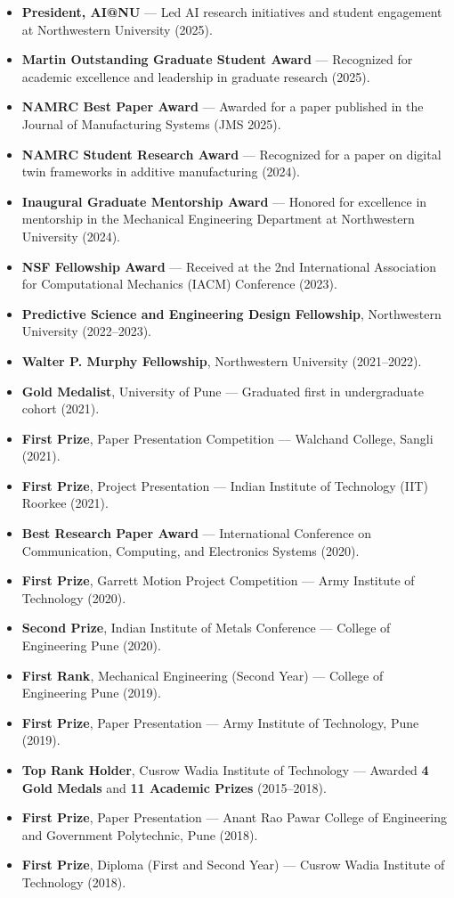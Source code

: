 \documentclass[11pt,a4paper,sans]{moderncv}
\begin{document}
\begin{itemize}
    \item \textbf{President, AI@NU} — Led AI research initiatives and student engagement at Northwestern University (2025).
    \item \textbf{Martin Outstanding Graduate Student Award} — Recognized for academic excellence and leadership in graduate research (2025).
    \item \textbf{NAMRC Best Paper Award} — Awarded for a paper published in the Journal of Manufacturing Systems (JMS 2025).
    \item \textbf{NAMRC Student Research Award} — Recognized for a paper on digital twin frameworks in additive manufacturing (2024).
    \item \textbf{Inaugural Graduate Mentorship Award} — Honored for excellence in mentorship in the Mechanical Engineering Department at Northwestern University (2024).
    \item \textbf{NSF Fellowship Award} — Received at the 2nd International Association for Computational Mechanics (IACM) Conference (2023).
    \item \textbf{Predictive Science and Engineering Design Fellowship}, Northwestern University (2022–2023).
    \item \textbf{Walter P. Murphy Fellowship}, Northwestern University (2021–2022).
    \item \textbf{Gold Medalist}, University of Pune — Graduated first in undergraduate cohort (2021).
    \item \textbf{First Prize}, Paper Presentation Competition — Walchand College, Sangli (2021).
    \item \textbf{First Prize}, Project Presentation — Indian Institute of Technology (IIT) Roorkee (2021).
    \item \textbf{Best Research Paper Award} — International Conference on Communication, Computing, and Electronics Systems (2020).
    \item \textbf{First Prize}, Garrett Motion Project Competition — Army Institute of Technology (2020).
    \item \textbf{Second Prize}, Indian Institute of Metals Conference — College of Engineering Pune (2020).
    \item \textbf{First Rank}, Mechanical Engineering (Second Year) — College of Engineering Pune (2019).
    \item \textbf{First Prize}, Paper Presentation — Army Institute of Technology, Pune (2019).
    \item \textbf{Top Rank Holder}, Cusrow Wadia Institute of Technology — Awarded \textbf{4 Gold Medals} and \textbf{11 Academic Prizes} (2015–2018).
    \item \textbf{First Prize}, Paper Presentation — Anant Rao Pawar College of Engineering and Government Polytechnic, Pune (2018).
    \item \textbf{First Prize}, Diploma (First and Second Year) — Cusrow Wadia Institute of Technology (2018).
\end{itemize}
\end{document}
